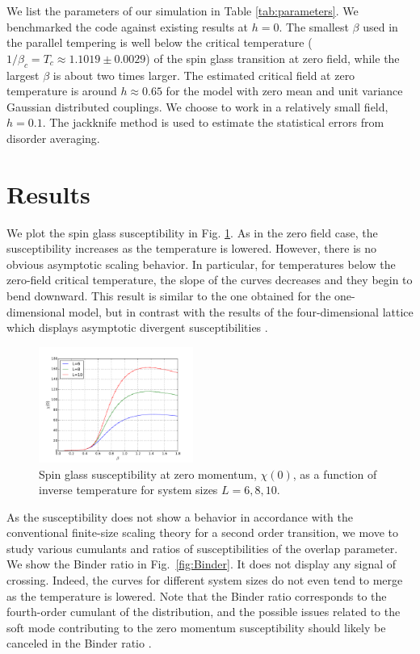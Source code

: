 \documentclass[aps,prb,twocolumn,showpacs,superscriptaddress]{revtex4}
\begin{document}
We list the parameters of our simulation in Table \ref{tab:parameters}. We 
benchmarked the code against existing results at $h=0$.  The smallest 
$\beta$ used in the parallel tempering is well below the critical temperature ($1/\beta_{c} = T_{c} \approx 1.1019 \pm 0.0029$) \cite{Baity-Jesi-etal-2013} of 
the spin glass transition at zero field\cite{Ballesteros2000,Baity-Jesi-etal-2013}, while the largest $\beta$ 
is about two times larger.  The estimated critical field at zero temperature is around $h \approx 0.65$ for 
the model with zero mean and unit variance Gaussian distributed couplings\cite{Krzakala-etal-2001}. 
We choose to work in a relatively small field, $h=0.1$. 
The jackknife method is used to estimate the statistical errors from disorder averaging. 



\section{Results} 
We plot the spin glass susceptibility in Fig. \ref{fig:Chi}. As in the 
zero field case, the susceptibility increases as the temperature is lowered. However, there is
no obvious asymptotic scaling behavior. In particular, for temperatures below  
the zero-field critical temperature, the
slope of the curves decreases and they begin to bend downward. This result is similar to the one obtained for
the one-dimensional model\cite{Larson-etal-2013}, but in contrast with the results of the four-dimensional lattice 
which displays asymptotic divergent susceptibilities \cite{Marinari-etal-1998}.

\begin{figure}[ht]
  \includegraphics[width=0.45\textwidth]{img/chi.pdf}%
  \caption{\label{fig:Chi} Spin glass susceptibility at zero momentum, $\chi(0)$, as a function of inverse temperature 
for system sizes $L=6,8,10$.}
\end{figure}


As the susceptibility does not show a behavior in accordance with the conventional 
finite-size scaling theory for a second order transition, we move to study various 
cumulants and ratios of susceptibilities of the overlap parameter. We show the Binder ratio in Fig.~\ref{fig:Binder}. It does not display any signal of crossing. 
Indeed, the curves for different system sizes do not even tend to merge as the temperature 
is lowered.  Note that the Binder ratio corresponds to the fourth-order cumulant of the 
distribution, and 
the possible issues related to the soft mode  
contributing to the zero momentum susceptibility should likely be canceled in the Binder ratio \cite{Banos-2012}.
\end{document}
